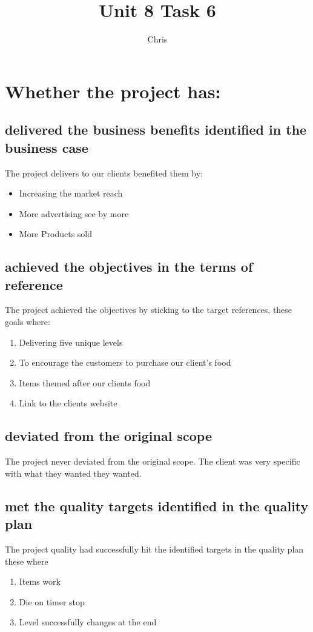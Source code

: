 \documentclass{article}
\begin{document}
\title{Unit 8 Task 6}
\author{Chris}
\date{}
\maketitle

\section{Whether the project has:}
	\subsection{delivered the business benefits identified in the business case}
	The project delivers to our clients benefited them by:
	\begin{itemize}
		\item Increasing the market reach 
		\item More advertising see by more
		\item More Products sold
	\end{itemize}

	\subsection{achieved the objectives in the terms of reference}
	The project achieved the objectives by sticking to the target references, these goals where:
	\begin{enumerate}
		\item Delivering five unique levels
		\item To encourage the customers to purchase our client's food 
		\item Items themed after our clients food
		\item Link to the clients website
	\end{enumerate}

	\subsection{deviated from the original scope}
	The project never deviated from the original scope. The client was very specific with what they wanted they wanted.

	\subsection{met the quality targets identified in the quality plan}
	The project quality had successfully hit the identified targets in the quality plan these where
	\begin{enumerate}
		\item Items work
		\item Die on timer stop
		\item Level successfully changes at the end
	\end{enumerate}
\end{document}
